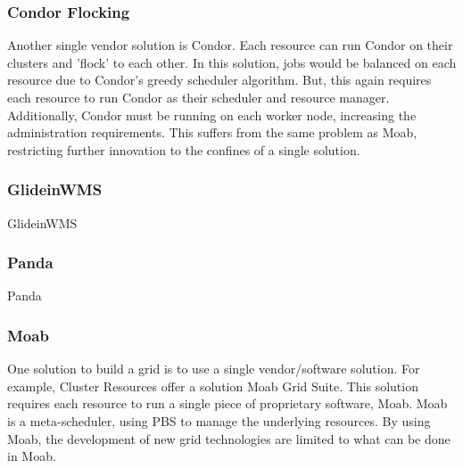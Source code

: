 \documentclass[11pt]{article}
\begin{document}
\subsubsection{Condor Flocking}
Another single vendor solution is Condor.  Each resource can run Condor on their clusters and 'flock' \cite{epema1996worldwide} to each other.  In this solution, jobs would be balanced on each resource due to Condor's greedy scheduler algorithm.  But, this again requires each resource to run Condor as their scheduler and resource manager.  Additionally, Condor must be running on each worker node, increasing the administration requirements.  This suffers from the same problem as Moab, restricting further innovation to the confines of a single solution.


\subsubsection{GlideinWMS}
GlideinWMS

\subsubsection{Panda}
Panda

\subsubsection{Moab}
One solution to build a grid is to use a single vendor/software solution.  For example, Cluster Resources offer a solution Moab Grid Suite\cite{website:moabgrid}.  This solution requires each resource to run a single piece of proprietary software, Moab.  Moab is a meta-scheduler, using PBS to manage the underlying resources.  By using Moab, the development of new grid technologies are limited to what can be done in Moab.






\end{document}
